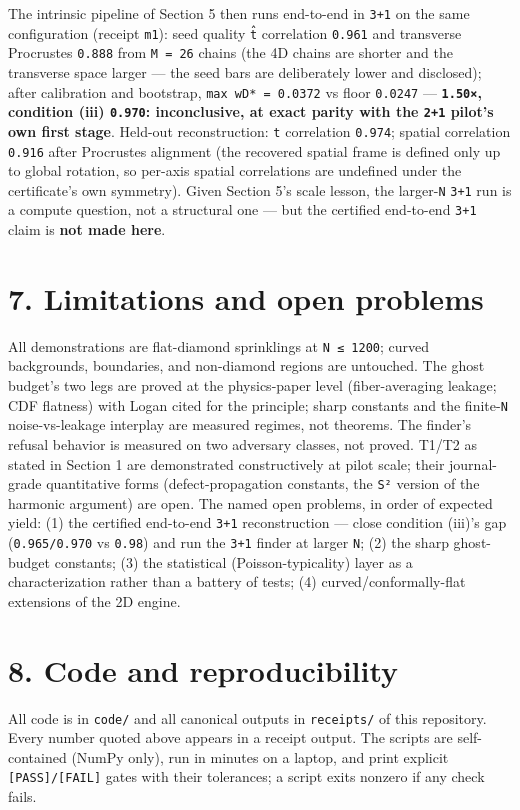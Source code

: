 \documentclass[11pt]{article}
\begin{document}
The intrinsic pipeline of Section 5 then runs end-to-end in \texttt{3+1} on the same configuration (receipt \texttt{m1}): seed quality \texttt{t̂} correlation \texttt{0.961} and transverse Procrustes \texttt{0.888} from \texttt{M = 26} chains (the 4D chains are shorter and the transverse space larger — the seed bars are deliberately lower and disclosed); after calibration and bootstrap, \texttt{max wD* = 0.0372} vs floor \texttt{0.0247} — \textbf{\texttt{1.50×}, condition (iii) \texttt{0.970}: inconclusive, at exact parity with the \texttt{2+1} pilot's own first stage}. Held-out reconstruction: \texttt{t} correlation \texttt{0.974}; spatial correlation \texttt{0.916} after Procrustes alignment (the recovered spatial frame is defined only up to global rotation, so per-axis spatial correlations are undefined under the certificate's own symmetry). Given Section 5's scale lesson, the larger-\texttt{N} \texttt{3+1} run is a compute question, not a structural one — but the certified end-to-end \texttt{3+1} claim is \textbf{not made here}.

\section*{7. Limitations and open problems}
All demonstrations are flat-diamond sprinklings at \texttt{N ≤ 1200}; curved backgrounds, boundaries, and non-diamond regions are untouched. The ghost budget's two legs are proved at the physics-paper level (fiber-averaging leakage; CDF flatness) with Logan cited for the principle; sharp constants and the finite-\texttt{N} noise-vs-leakage interplay are measured regimes, not theorems. The finder's refusal behavior is measured on two adversary classes, not proved. T1/T2 as stated in Section 1 are demonstrated constructively at pilot scale; their journal-grade quantitative forms (defect-propagation constants, the \texttt{S²} version of the harmonic argument) are open. The named open problems, in order of expected yield: (1) the certified end-to-end \texttt{3+1} reconstruction — close condition (iii)'s gap (\texttt{0.965/0.970} vs \texttt{0.98}) and run the \texttt{3+1} finder at larger \texttt{N}; (2) the sharp ghost-budget constants; (3) the statistical (Poisson-typicality) layer as a characterization rather than a battery of tests; (4) curved/conformally-flat extensions of the 2D engine.

\section*{8. Code and reproducibility}
All code is in \texttt{code/} and all canonical outputs in \texttt{receipts/} of this repository. Every number quoted above appears in a receipt output. The scripts are self-contained (NumPy only), run in minutes on a laptop, and print explicit \texttt{[PASS]/[FAIL]} gates with their tolerances; a script exits nonzero if any check fails.
\end{document}
